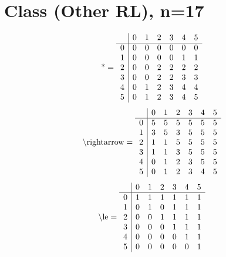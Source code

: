 \documentclass[11pt]{article}
\begin{document}
\section{Class (Other RL), n=17}
\[\text{*} = 
\begin{array}{r | r r r r r r}
 & 0 & 1 & 2 & 3 & 4 & 5 \\ \hline
0 & 0 & 0 & 0 & 0 & 0 & 0 \\
1 & 0 & 0 & 0 & 0 & 1 & 1 \\
2 & 0 & 0 & 2 & 2 & 2 & 2 \\
3 & 0 & 0 & 2 & 2 & 3 & 3 \\
4 & 0 & 1 & 2 & 3 & 4 & 4 \\
5 & 0 & 1 & 2 & 3 & 4 & 5 \\
\end{array}
\]
\[\text{\textbackslash rightarrow} = 
\begin{array}{r | r r r r r r}
 & 0 & 1 & 2 & 3 & 4 & 5 \\ \hline
0 & 5 & 5 & 5 & 5 & 5 & 5 \\
1 & 3 & 5 & 3 & 5 & 5 & 5 \\
2 & 1 & 1 & 5 & 5 & 5 & 5 \\
3 & 1 & 1 & 3 & 5 & 5 & 5 \\
4 & 0 & 1 & 2 & 3 & 5 & 5 \\
5 & 0 & 1 & 2 & 3 & 4 & 5 \\
\end{array}
\]
\[\text{\textbackslash le} = 
\begin{array}{r | r r r r r r}
 & 0 & 1 & 2 & 3 & 4 & 5 \\ \hline
0 & 1 & 1 & 1 & 1 & 1 & 1 \\
1 & 0 & 1 & 0 & 1 & 1 & 1 \\
2 & 0 & 0 & 1 & 1 & 1 & 1 \\
3 & 0 & 0 & 0 & 1 & 1 & 1 \\
4 & 0 & 0 & 0 & 0 & 1 & 1 \\
5 & 0 & 0 & 0 & 0 & 0 & 1 \\
\end{array}
\]
\end{document}

